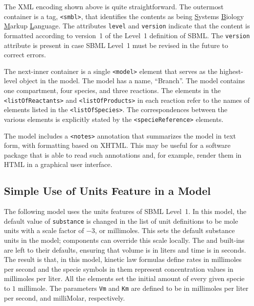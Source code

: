 \documentclass[10pt]{cekarticle}
\begin{document}
The XML encoding shown above is quite straightforward. The outermost
container is a tag, \texttt{<smbl>}, that identifies the contents as being
\underline{S}ystems \underline{B}iology \underline{M}arkup
\underline{L}anguage.  The attributes \texttt{level} and \texttt{version}
indicate that the content is formatted according to version~1 of the
Level~1 definition of SBML.  The \texttt{version} attribute is present in
case SBML Level~1 must be revised in the future to correct errors.

The next-inner container is a single \texttt{<model>} element that serves as
the highest-level object in the model.  The model has a name, ``Branch''.
The model contains one compartment, four species, and three reactions.  The
elements in the \texttt{<listOfReactants>} and \texttt{<listOfProducts>} in
each reaction refer to the names of elements listed in the
\texttt{<listOfSpecies>}.  The correspondences between the various elements
is explicitly stated by the \texttt{<specieReference>} elements.

The model includes a \texttt{<notes>} annotation that summarizes the model
in text form, with formatting based on XHTML.  This may be useful for a
software package that is able to read such annotations and, for example,
render them in HTML in a graphical user interface.


\subsection{Simple Use of Units Feature in a Model}
\label{apdx:units-eg}

The following model uses the units features of SBML Level~1.  In this
model, the default value of \texttt{substance} is changed in the list of
unit definitions to be mole units with a scale factor of $-3$, or
millimoles.  This sets the default substance units in the model; components
can override this scale locally.  The  and 
built-ins are left to their defaults, ensuring that volume is in liters and
time is in seconds.  The result is that, in this model, kinetic law
formulas define rates in millimoles per second and the specie symbols in
them represent concentration values in millimoles per liter.  All the
 elements set the initial amount of every given specie to $1$
millimole.  The parameters \texttt{Vm} and \texttt{Km} are defined to be in
millimoles per liter per second, and milliMolar, respectively.
\end{document}
